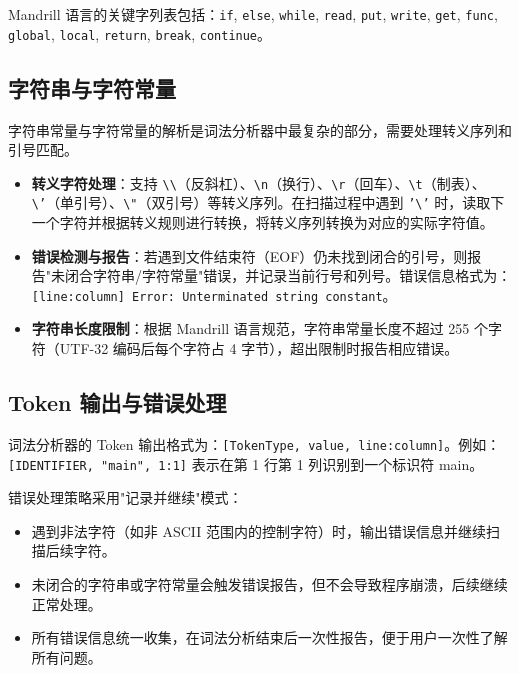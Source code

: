 \documentclass[12pt,hyperref,a4paper,UTF8]{ctexart}
\begin{document}
Mandrill 语言的关键字列表包括：\texttt{if}, \texttt{else}, \texttt{while}, \texttt{read}, \texttt{put}, \texttt{write}, \texttt{get}, \texttt{func}, \texttt{global}, \texttt{local}, \texttt{return}, \texttt{break}, \texttt{continue}。

\subsection{字符串与字符常量}

字符串常量与字符常量的解析是词法分析器中最复杂的部分，需要处理转义序列和引号匹配。

\begin{itemize}
    \item \textbf{转义字符处理}：支持 \texttt{\textbackslash\textbackslash}（反斜杠）、\texttt{\textbackslash n}（换行）、\texttt{\textbackslash r}（回车）、\texttt{\textbackslash t}（制表）、\texttt{\textbackslash '}（单引号）、\texttt{\textbackslash "}（双引号）等转义序列。在扫描过程中遇到 \texttt{'\textbackslash'} 时，读取下一个字符并根据转义规则进行转换，将转义序列转换为对应的实际字符值。
    \item \textbf{错误检测与报告}：若遇到文件结束符（EOF）仍未找到闭合的引号，则报告"未闭合字符串/字符常量"错误，并记录当前行号和列号。错误信息格式为：\texttt{[line:column] Error: Unterminated string constant}。
    \item \textbf{字符串长度限制}：根据 Mandrill 语言规范，字符串常量长度不超过 255 个字符（UTF-32 编码后每个字符占 4 字节），超出限制时报告相应错误。
\end{itemize}

\subsection{Token 输出与错误处理}

词法分析器的 Token 输出格式为：\texttt{[TokenType, value, line:column]}。例如：\texttt{[IDENTIFIER, "main", 1:1]} 表示在第 1 行第 1 列识别到一个标识符 main。

错误处理策略采用"记录并继续"模式：
\begin{itemize}
    \item 遇到非法字符（如非 ASCII 范围内的控制字符）时，输出错误信息并继续扫描后续字符。
    \item 未闭合的字符串或字符常量会触发错误报告，但不会导致程序崩溃，后续继续正常处理。
    \item 所有错误信息统一收集，在词法分析结束后一次性报告，便于用户一次性了解所有问题。
\end{itemize}
\end{document}
